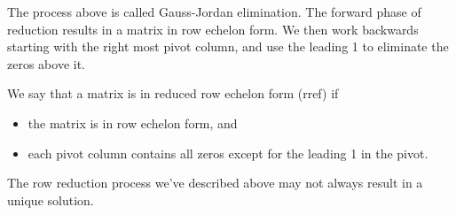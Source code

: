The process above is called Gauss-Jordan elimination. The forward phase of reduction results in a matrix in row echelon form.  We then work backwards starting with the right most pivot column, and use the leading 1 to eliminate the zeros above it.

\begin{definition}
We say that a matrix is in reduced row echelon form (rref) if 
\begin{itemize}
\item the matrix is in row echelon form, and 
\item each pivot column contains all zeros except for the leading 1 in the pivot.
\end{itemize}
\end{definition}

The row reduction process we've described above may not always result in a unique solution. 

